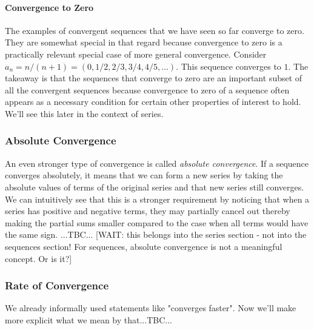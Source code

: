 \paragraph{Convergence to Zero} The examples of convergent sequences that we have seen so far converge to zero. They are somewhat special in that regard because convergence to zero is a practically relevant special case of more general convergence. Consider $a_n = n/(n+1) = (0,1/2,2/3,3/4,4/5,\ldots)$. This sequence converges to $1$. The takeaway is that the sequences that converge to zero are an important subset of all the convergent sequences because convergence to zero of a sequence often appears as a necessary condition for certain other properties of interest to hold. We'll see this later in the context of series.




\subsubsection{Absolute Convergence}
An even stronger type of convergence is called \emph{absolute convergence}. If a sequence converges absolutely, it means that we can form a new series by taking the absolute values of terms of the original series and that new series still converges. We can intuitively see that this is a stronger requirement by noticing that when a series has positive and negative terms, they may partially cancel out thereby making the partial sums smaller compared to the case when all terms would have the same sign. ...TBC...
[WAIT: this belongs into the series section - not into the sequences section! For sequences, absolute convergence is not a meaningful concept. Or is it?]





\subsubsection{Rate of Convergence}
We already informally used statements like "converges faster". Now we'll make more explicit what we mean by that...TBC...





